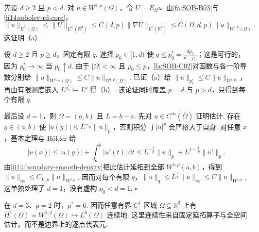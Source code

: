 \begin{FAProof}
先设 \(\displaystyle d\geqslant2\) 且 \(\displaystyle p<d\). 对 \(\displaystyle u\in W^{1,p}(\Omega)\)，令 \(\displaystyle U=E_\Omega u\). 由\autoref{fa:SOB-B03}与\autoref{ii14:sobolev-rd-core}，
\[
\|u\|_{L^{p^*}(\Omega)}
\leqslant
\|U\|_{L^{p^*}(\mathbb R^d)}
\leqslant
C(d,p)\|\nabla U\|_{L^p(\mathbb R^d)}
\leqslant
C(\Omega,d,p)\|u\|_{W^{1,p}(\Omega)}.
\]
这证明（a）.

设 \(\displaystyle d\geqslant2\) 且 \(\displaystyle p\geqslant d\)，固定有限 \(\displaystyle q\). 选择 \(\displaystyle p_0\in[1,d)\) 使 \(\displaystyle q\leqslant p_0^*=\frac{dp_0}{d-p_0}\)；这是可行的，因为 \(\displaystyle p_0^*\to\infty\) 当 \(\displaystyle p_0\uparrow d\). 由于 \(\displaystyle|\Omega|<\infty\) 且 \(\displaystyle p_0\leqslant p\)，\autoref{fa:SOB-C02}对函数与各一阶导数分别给 \(\displaystyle\|u\|_{W^{1,p_0}(\Omega)}\leqslant C\|u\|_{W^{1,p}(\Omega)}\). 已证（a）给 \(\displaystyle\|u\|_{p_0^*}\leqslant C\|u\|_{W^{1,p_0}}\)，再由有限测度嵌入 \(\displaystyle L^{p_0^*}\hookrightarrow L^q\) 得（b）. 该论证同时覆盖 \(\displaystyle p=d\) 与 \(\displaystyle p>d\)，只得到每个有限 \(\displaystyle q\).

最后设 \(\displaystyle d=1\)，则 \(\displaystyle\Omega=(a,b)\) 且 \(\displaystyle L=b-a\). 先对 \(\displaystyle u\in C^\infty(\overline\Omega)\) 证明估计. 存在 \(\displaystyle y\in(a,b)\) 使 \(\displaystyle|u(y)|\leqslant L^{-\frac{1}{p}}\|u\|_p\)，否则积分 \(\displaystyle\int|u|^p\) 会严格大于自身. 对任意 \(\displaystyle x\)，基本定理与 Hölder 给
\[
|u(x)|
\leqslant
|u(y)|+\int_a^b|u'(t)|\,\mathrm{d}t
\leqslant
L^{-\frac{1}{p}}\|u\|_p+L^{1-\frac{1}{p}}\|u'\|_p.
\]
由\autoref{ii14:boundary-smooth-density}把此估计延拓到全部 \(\displaystyle W^{1,p}(a,b)\)，得到 \(\displaystyle\|u\|_\infty\leqslant C_{L,p}\|u\|_{W^{1,p}}\). 因而对每个有限 \(\displaystyle q\)，\(\displaystyle\|u\|_q\leqslant L^{\frac{1}{q}}\|u\|_\infty\leqslant C\|u\|_{W^{1,p}}\). 这单独处理了 \(\displaystyle d=1\)，没有虚构 \(\displaystyle p_0<d=1\).
\hfill\(\square\)
\end{FAProof}

\begin{FAExample}
在 \(\displaystyle d=3\)、\(\displaystyle p=2\) 时，\(\displaystyle p^*=6\). 因而任意有界 \(\displaystyle C^1\) 区域 \(\displaystyle\Omega\subseteq\mathbb R^3\) 上有 \(\displaystyle H^1(\Omega)=W^{1,2}(\Omega)\hookrightarrow L^6(\Omega)\) 连续地. 这里连续性来自固定延拓算子与全空间估计，而不是边界上的逐点代表元.
\end{FAExample}

